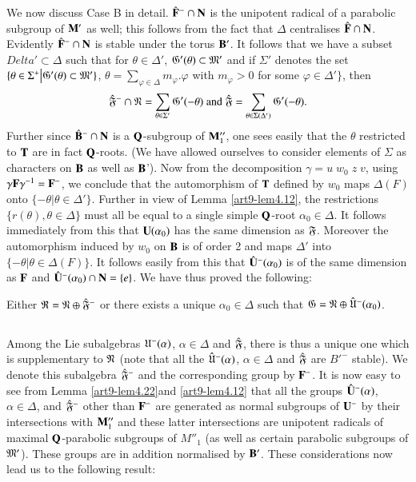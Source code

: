 We now discuss Case B in detail. $\hat{\mathbf{F}}^- \cap \mathbf{N}$ is the unipotent radical of a parabolic subgroup of $\mathbf{M}'$ as well; this follows from the fact that $\Delta$ centralises $\hat{\mathbf{F}} \cap \mathbf{N}$. Evidently $\hat{\mathbf{F}}^- \cap \mathbf{N}$ is stable under the torus $\mathbf{B}'$. It follows that we have a subset $Delta' \subset \Delta$ such that for $\theta \in \Delta'$, $\mathfrak{G}' (\theta) \subset \mathfrak{M}'$  and if $\Sigma'$ denotes the set $\{\theta \in \Sigma^+ \big|\mathfrak{G}' (\theta) \subset \mathfrak{M}'\}$, $\theta = \sum\limits_{\varphi \in \Delta} m_\varphi. \varphi$ with $m_\varphi >0$ for some $\varphi \in \Delta'\}$, then
$$
\hat{\mathfrak{F}}^- \cap \mathfrak{N} = \sum\limits_{\theta \in \Sigma'} \mathfrak{G}' (-\theta) \text{ and } \hat{\mathfrak{F}} = \sum\limits_{\theta \in \Sigma (\Delta')} \mathfrak{G}' (-\theta).
$$
Further since $\hat{\mathbf{B}}^- \cap \mathbf{N}$ is a $\mathbf{Q}$-subgroup of $\mathbf{M}''_1$, one sees easily that the $\theta$ restricted to $\mathbf{T}$ are in fact $\mathbf{Q}$-roots. (We have allowed ourselves to consider elements of $\Sigma$ as characters on $\mathbf{B}$ as well as $\mathbf{B}$'). Now from the decomposition $\gamma = u \;w_0 \;z \;v$, using $\gamma \mathbf{F} \gamma^{-1} = \mathbf{F}^-$, we conclude that the automorphism of $\mathbf{T}$ defined by $w_0$  maps $\Delta (F)$ onto $\{- \theta \big| \theta \in \Delta'\}$. Further in view of Lemma \ref{art9-lem4.12}, the restrictions $\{r (\theta), \theta \in\Delta\}$ must all be equal to a single simple $\mathbf{Q}$-root $\alpha_0 \in \Delta$. It follows immediately from this that $\mathbf{U} (\alpha_0)$ has the same dimension as $\mathfrak{F}$. Moreover the automorphism induced by $w_0$ on $\mathbf{B}$ is of order 2 and maps $\Delta'$ into $\{- \theta \big| \theta \in \Delta (F)\}$. It follows easily from this that $\hat{\mathbf{U}}^-(\alpha_0)$ is of the same dimension as $\mathbf{F}$ and $\hat{\mathbf{U}}^- (\alpha_0) \cap \mathbf{N} = \{e\}$. We have thus proved the following:
 
\setcounter{definition}{24}
\begin{lemma}\label{art9-lem4.25}
Either $\mathfrak{R} = \mathfrak{N} \oplus \hat{\mathfrak{F}}^-$ or there exists a unique $\alpha_0 \in\Delta$ such that $\mathfrak{G} = \mathfrak{N} \oplus \hat{\mathfrak{U}}^-(\alpha_0)$.
\end{lemma}

\setcounter{subsection}{25}
\subsection{}\label{art9-subsec4.26}
Among the Lie subalgebras $\mathfrak{U}^-(\alpha)$, $\alpha \in \Delta$ and $\hat{\mathfrak{F}}$, there is thus a unique one which is supplementary to $\mathfrak{N}$ (note that all the $\hat{\mathfrak{U}}^-(\alpha)$, $\alpha \in \Delta$ and $\hat{\mathfrak{F}}$ are $B'^-$ stable). We denote this subalgebra $\hat{\mathfrak{F}}^-$ and the corresponding group by $\mathbf{F}^-$. It is now easy to see from  Lemma \ref{art9-lem4.22}\pageoriginale  and  \ref{art9-lem4.12} that all the groups $\hat{\mathbf{U}}^-(\alpha)$, $\alpha \in \Delta$, and $\hat{\mathfrak{F}}^-$ other than $\mathbf{F}^-$ are generated as normal subgroups of $\mathbf{U}^-$ by their intersections with $\mathbf{M}''_1$ and these latter intersections are unipotent radicals of maximal $\mathbf{Q}$-parabolic subgroups of $M''_1$ (as well as certain parabolic subgroups of $\mathfrak{M}'$). These groups are in addition normalised by $\mathbf{B}'$. These considerations now lead us to the following result:

